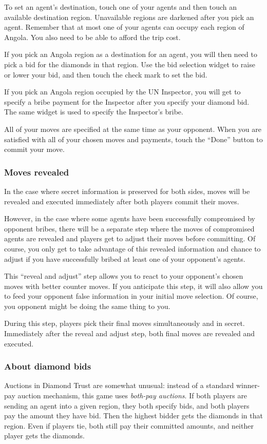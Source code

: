 \documentclass[8pt]{extbook}
\begin{document}
To set an agent's destination, touch one of your agents and then touch an available destination region.  Unavailable regions are darkened after you pick an agent.  Remember that at most one of your agents can occupy each region of Angola.  You also need to be able to afford the trip cost.

If you pick an Angola region as a destination for an agent, you will then need to pick a bid for the diamonds in that region.  Use the bid selection widget to raise or lower your bid, and then touch the check mark to set the bid.

If you pick an Angola region occupied by the UN Inspector, you will get to specify a bribe payment for the Inspector after you specify your diamond bid.  The same widget is used to specify the Inspector's bribe.

All of your moves are specified at the same time as your opponent.  When you are satisfied with all of your chosen moves and payments, touch the ``Done'' button to commit your move.

\subsubsection{Moves revealed}
In the case where secret information is preserved for both sides, moves will be revealed and executed immediately after both players commit their moves.

However, in the case where some agents have been successfully compromised by opponent bribes, there will be a separate step where the moves of compromised agents are revealed and players get to adjust their moves before committing.  Of course, you only get to take advantage of this revealed information and chance to adjust if you have successfully bribed at least one of your opponent's agents.

This ``reveal and adjust'' step allows you to react to your opponent's chosen moves with better counter moves.  If you anticipate this step, it will also allow you to feed your opponent false information in your initial move selection.  Of course, you opponent might be doing the same thing to you.

During this step, players pick their final moves simultaneously and in secret.  Immediately after the reveal and adjust step, both final moves are revealed and executed.

\subsubsection{About diamond bids}
Auctions in Diamond Trust are somewhat unusual:  instead of a standard winner-pay auction mechanism, this game uses {\it both-pay auctions}.  If both players are sending an agent into a given region, they both specify bids, and both players pay the amount they have bid.  Then the highest bidder gets the diamonds in that region.  Even if players tie, both still pay their committed amounts, and neither player gets the diamonds.
\end{document}
